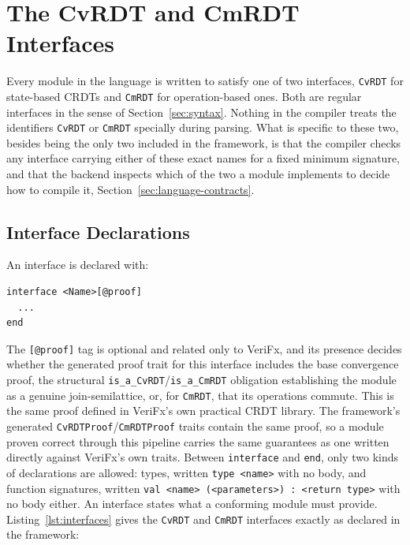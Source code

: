 \section{The CvRDT and CmRDT Interfaces}
\label{sec:language-interfaces}

Every module in the language is written to satisfy one of two interfaces, \texttt{CvRDT} for state-based CRDTs and
\texttt{CmRDT} for operation-based ones. Both are regular interfaces in the sense of Section~\ref{sec:syntax}. Nothing in the
compiler treats the identifiers \texttt{CvRDT} or \texttt{CmRDT} specially during parsing. What is specific to these two,
besides being the only two included in the framework, is that the compiler checks any interface carrying either of these
exact names for a fixed minimum signature, and that the backend inspects which of the two a module implements to decide
how to compile it, Section~\ref{sec:language-contracts}.

\subsection{Interface Declarations}
\label{sub:interface-decl}

An interface is declared with:

\begin{verbatim}
interface <Name>[@proof]
  ...
end
\end{verbatim}

The \texttt{[@proof]} tag is optional and related only to VeriFx, and its presence decides whether the generated proof
trait for this interface includes the base convergence proof, the structural \texttt{is\_a\_CvRDT}/\texttt{is\_a\_CmRDT}
obligation establishing the module as a genuine join-semilattice, or, for \texttt{CmRDT}, that its operations commute.
This is the same proof defined in VeriFx's own practical CRDT library. The framework's generated
\texttt{CvRDTProof}/\texttt{CmRDTProof} traits contain the same proof, so a module proven correct through this pipeline
carries the same guarantees as one written directly against VeriFx's own traits. Between \texttt{interface} and
\texttt{end}, only two kinds of declarations are allowed: types, written \texttt{type <name>} with no body, and function
signatures, written \texttt{val <name> (<parameters>) : <return type>} with no body either. An interface states what a
conforming module must provide. Listing~\ref{lst:interfaces} gives the \texttt{CvRDT} and \texttt{CmRDT} interfaces
exactly as declared in the framework:

